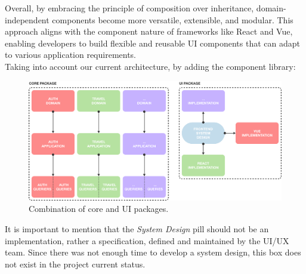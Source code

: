 \documentclass[../design.tex]{subfiles}
\begin{document}
Overall, by embracing the principle of composition over inheritance,
domain-independent components become more versatile, extensible, and modular.
This approach aligns with the component nature of frameworks like React
and Vue, enabling developers to build flexible and reusable UI components that
can adapt to various application requirements.
\\[8pt]
Taking into account our current architecture, by adding the component library:
\begin{figure}[H]
	\centering
	\includegraphics[width=\textwidth]{./assets/ui-core.png}
	\caption{Combination of core and UI packages.}
\end{figure}
It is important to mention that the \emph{System Design} pill should not be an
implementation, rather a specification, defined and maintained by the UI/UX
team. Since there was not enough time to develop a system design, this box does
not exist in the project current status.
\end{document}
